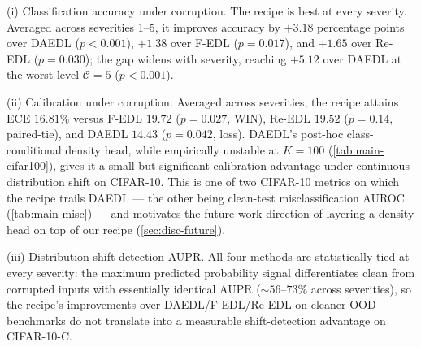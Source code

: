 \documentclass[review,5p,times]{elsarticle}
\begin{document}
(i) Classification accuracy under corruption.  The recipe is best at
every severity. Averaged across severities 1--5, it improves accuracy
by $+3.18$ percentage points over DAEDL ($p\!<\!0.001$), $+1.38$ over
F-EDL ($p\!=\!0.017$), and $+1.65$ over Re-EDL ($p\!=\!0.030$);
the gap widens with severity, reaching $+5.12$ over DAEDL at the
worst level $\mathcal{C}\!=\!5$ ($p\!<\!0.001$).

(ii) Calibration under corruption.  Averaged across severities, the
recipe attains ECE $16.81\%$ versus F-EDL $19.72$ ($p\!=\!0.027$,
WIN), Re-EDL $19.52$ ($p\!=\!0.14$, paired-tie), and DAEDL $14.43$
($p\!=\!0.042$, loss).  DAEDL's post-hoc class-conditional density
head, while empirically unstable at $K\!=\!100$
(\autoref{tab:main-cifar100}), gives it a small but significant
calibration advantage under continuous distribution shift on
CIFAR-10. This is one of two CIFAR-10 metrics on which the recipe
trails DAEDL --- the other being clean-test misclassification AUROC
(\autoref{tab:main-misc}) --- and motivates the future-work direction
of layering a density head on top of our recipe
(\autoref{sec:disc-future}).

(iii) Distribution-shift detection AUPR.  All four methods are
statistically tied at every severity: the maximum predicted
probability signal differentiates clean from corrupted inputs with
essentially identical AUPR ($\sim\!56$--$73\%$ across severities), so
the recipe's improvements over DAEDL/F-EDL/Re-EDL on cleaner OOD
benchmarks do not translate into a measurable shift-detection
advantage on CIFAR-10-C.
\end{document}
